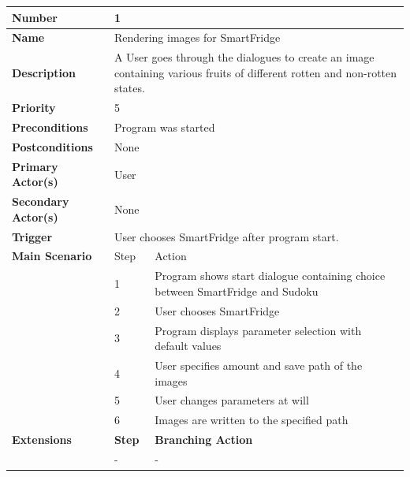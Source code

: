 \documentclass[a4paper,12pt]{article}
\begin{document}
\begin{tabularx}{\linewidth}{|l|l|X|}
\hline
\textbf{Number} & \multicolumn{2}{l|}{1} \\
\hline
\textbf{Name} & \multicolumn{2}{l|}{Rendering images for SmartFridge} \\
\hline
\textbf{Description} &  \multicolumn{2}{X|}{A User goes through the dialogues to create an image containing various fruits of different rotten and non-rotten states.} \\
\hline
\textbf{Priority} & \multicolumn{2}{l|}{5} \\
\hline
\textbf{Preconditions} & \multicolumn{2}{l|}{Program was started} \\
\hline
\textbf{Postconditions} & \multicolumn{2}{l|}{None} \\
\hline
\textbf{Primary Actor(s)} & \multicolumn{2}{l|}{User} \\
\hline
\textbf{Secondary Actor(s)} & \multicolumn{2}{l|}{None} \\
\hline
\textbf{Trigger} & \multicolumn{2}{l|}{User chooses SmartFridge after program start.} \\
\hline
\textbf{Main Scenario} & Step & Action\\
\hline
 & 1 & Program shows start dialogue containing choice between SmartFridge and Sudoku\\
\cline{2-3}
 & 2 & User chooses SmartFridge\\
\cline{2-3}
 & 3 & Program displays parameter selection with default values\\
\cline{2-3}
 & 4 & User specifies amount and save path of the images \\
\cline{2-3}
 & 5 & User changes parameters at will \\
\cline{2-3}
 & 6 & Images are written to the specified path \\
\hline
\textbf{Extensions} & \textbf{Step} & \textbf{Branching Action} \\
\hline
& - & - \\
\hline
\end{tabularx}
 \\
 \\
 \\
\end{document}
